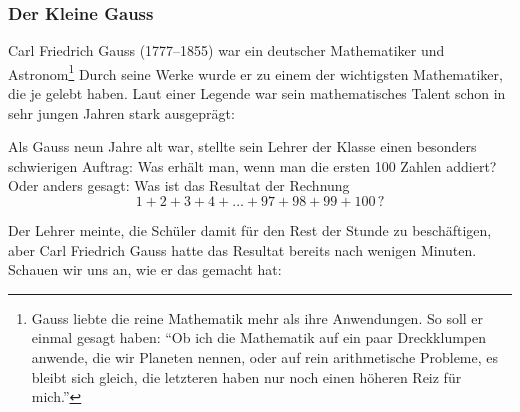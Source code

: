 \clearpage
\subsubsection*{Der Kleine Gauss}
Carl Friedrich Gauss (1777--1855) war ein deutscher Mathematiker und Astronom\footnote{Gauss liebte die reine Mathematik mehr als ihre Anwendungen. So soll er einmal gesagt haben:
    ``Ob ich die Mathematik auf ein paar Dreckklumpen anwende, die wir Planeten nennen, oder auf rein
    arithmetische Probleme, es bleibt sich gleich, die letzteren haben nur noch einen höheren Reiz für mich.''}
Durch seine Werke wurde er zu einem der wichtigsten Mathematiker, die je gelebt haben.
Laut einer Legende war sein mathematisches Talent schon in sehr jungen Jahren stark ausgeprägt:

Als Gauss neun Jahre alt war, stellte sein Lehrer der Klasse einen besonders schwierigen Auftrag:
Was erhält man, wenn man die ersten 100 Zahlen addiert? Oder anders gesagt: Was ist das Resultat der Rechnung
\[
    1+2+3+4+\dots+97+98+99+100\,?
\]

Der Lehrer meinte, die Schüler damit für den Rest der Stunde zu beschäftigen, aber Carl Friedrich Gauss
hatte das Resultat bereits nach wenigen Minuten. Schauen wir uns an, wie er das gemacht hat:

